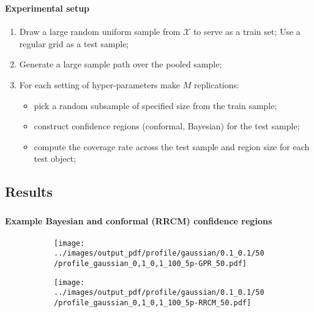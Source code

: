 \documentclass[t]{beamer}  %
\newcommand{\Xcal}{\mathcal{X}}
\begin{document}
\begin{frame}[c]\frametitle{\insertsection}
  \framesubtitle{Experimental setup}
  \begin{enumerate}
    \item Draw a large random uniform sample from $\Xcal$ to serve as a train set;
      Use a regular grid as a test sample;
    \item Generate a large sample path over the pooled sample;
    \item For each setting of hyper-parameters make $M$ replications: \begin{itemize}
      \item pick a random subsample of specified size from the train sample;
      \item construct confidence regions (conformal, Bayesian) for the test sample;
      \item compute the coverage rate across the test sample and region size for each test object;
    \end{itemize}
  \end{enumerate}
\end{frame}

\subsection{Results} %
\label{sub:results}

\begin{frame}[c]\frametitle{\insertsection}
  \framesubtitle{Example Bayesian and conformal (RRCM) confidence regions}
  \begin{figure}%
    \centering
    \begin{subfigure}[b]{0.45\linewidth}
      \texttt{[image: ../images/output\_pdf/profile/gaussian/0.1\_0.1/50/profile\_gaussian\_0,1\_0,1\_100\_5p-GPR\_50.pdf]}
    \end{subfigure}%
    \begin{subfigure}[b]{0.45\linewidth}
      \texttt{[image: ../images/output\_pdf/profile/gaussian/0.1\_0.1/50/profile\_gaussian\_0,1\_0,1\_100\_5p-RRCM\_50.pdf]}
    \end{subfigure}
    \label{fig:gauss_1d_prof_gpr}
  \end{figure}
\end{frame}
\end{document}
